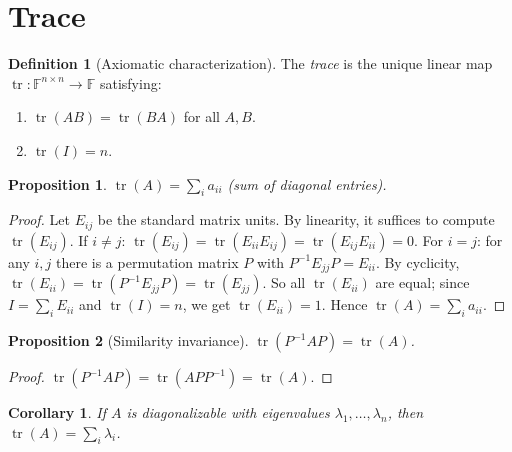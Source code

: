 \documentclass[11pt]{article}
\theoremstyle{definition}
\newtheorem{definition}{Definition}[section]
\theoremstyle{plain}
\newtheorem{proposition}{Proposition}[section]
\newtheorem{corollary}{Corollary}[section]
\begin{document}
\section{Trace}

\begin{definition}[Axiomatic characterization]
  The \emph{trace} is the unique linear map
  $\operatorname{tr}: \mathbb{F}^{n\times n}\to\mathbb{F}$ satisfying:
  \begin{enumerate}
    \item $\operatorname{tr}(AB) = \operatorname{tr}(BA)$ for all $A,B$.
    \item $\operatorname{tr}(I) = n$.
  \end{enumerate}
\end{definition}

\begin{proposition}
  $\operatorname{tr}(A) = \sum_i a_{ii}$ (sum of diagonal entries).
\end{proposition}
\begin{proof}
  Let $E_{ij}$ be the standard matrix units.  By linearity, it suffices to
  compute $\operatorname{tr}(E_{ij})$.  If $i\ne j$:
  $\operatorname{tr}(E_{ij}) = \operatorname{tr}(E_{ii}E_{ij}) =
  \operatorname{tr}(E_{ij}E_{ii}) = 0$.
  For $i=j$: for any $i,j$ there is a permutation matrix $P$ with
  $P^{-1}E_{jj}P = E_{ii}$.  By cyclicity,
  $\operatorname{tr}(E_{ii}) = \operatorname{tr}(P^{-1}E_{jj}P) = \operatorname{tr}(E_{jj})$.
  So all $\operatorname{tr}(E_{ii})$ are equal; since $I = \sum_i E_{ii}$ and
  $\operatorname{tr}(I) = n$, we get $\operatorname{tr}(E_{ii}) = 1$.
  Hence $\operatorname{tr}(A) = \sum_i a_{ii}$.
\end{proof}

\begin{proposition}[Similarity invariance]
  $\operatorname{tr}(P^{-1}AP) = \operatorname{tr}(A)$.
\end{proposition}
\begin{proof}
  $\operatorname{tr}(P^{-1}AP) = \operatorname{tr}(APP^{-1}) = \operatorname{tr}(A)$.
\end{proof}

\begin{corollary}
  If $A$ is diagonalizable with eigenvalues $\lambda_1,\ldots,\lambda_n$, then
  $\operatorname{tr}(A) = \sum_i \lambda_i$.
\end{corollary}
\end{document}
